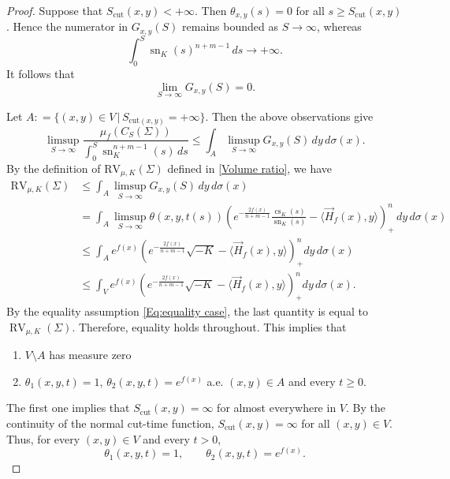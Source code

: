 \documentclass[psamsfonts]{amsart}
\theoremstyle{definition}
\theoremstyle{remark}
\DeclareMathOperator{\sn}{sn}
\numberwithin{equation}{section}
\begin{document}
\begin{proof}
    
    Suppose that $S_{\mathrm{cut}}(x,y)<+\infty$.
    Then $\theta_{x,y}(s)=0$ for all
    $s\geq S_{\mathrm{cut}}(x,y)$. Hence the numerator in
    $G_{x,y}(S)$ remains bounded as $S\to\infty$, whereas
    $$
        \int_0^S\sn_K(s)^{n+m-1}\,ds\longrightarrow+\infty.
    $$
    It follows that
    $$
        \lim_{S\to\infty}G_{x,y}(S)=0.
    $$

    Let $A : = \{ (x,y) \in V \, |\, S_{\mathrm{cut}(x,y)} = + \infty \}$.
    Then the above observations give
    $$\limsup_{S \to \infty} \frac{\mu_f (C_S (\Sigma))}{\int_0^S \operatorname{sn}_K^{n+m-1} (s) \, ds } \leq  \int_{A}\limsup_{S \to \infty } G_{x,y}(S) \, dy \, d\sigma(x).$$
    By the definition of $\mathrm{RV}_{\mu , K } (\Sigma) $ defined in \eqref{Volume ratio}, we have
    \begin{align*}
        \mathrm{RV}_{\mu , K } (\Sigma) & \leq \int_A \limsup_{S \to \infty} G_{x,y}(S) \, dy \, d \sigma (x)\\
        & = \int_A \limsup_{S \to \infty} \theta(x,y, t(s))  \left( e^{-\frac{2f(x)}{n+m-1}} \frac{\operatorname{cs}_K(s)}{\operatorname{sn}_K(s)} - \langle \vec H_f (x), y \rangle \right)_+^n\, dy \, d\sigma (x)\\
        &\leq \int_A e^{f(x)} \left( e^{-\frac{2f(x)}{n+m-1}}\sqrt{-K } - \langle \vec H_f (x), y \rangle  \right)_+^n dy \, d\sigma (x)\\
        & \leq \int_{V} e^{f(x)} \left( e^{-\frac{2f(x)}{n+m-1}}\sqrt{-K } - \langle \vec H_f (x), y \rangle  \right)_+^n dy \, d\sigma (x).
    \end{align*}
    By the equality assumption \eqref{Eq:equality case}, the last
    quantity is equal to $\operatorname{RV}_{\mu,K}(\Sigma)$.
    Therefore, equality holds throughout.
    This implies that
    \begin{enumerate}
        \item $V \setminus A$ has measure zero
        \item $\theta_1 (x,y,t) = 1$, $\theta_2 ( x,y, t) = e^{f(x)}$ a.e. $(x,y) \in A$ and every $t \geq 0$.
    \end{enumerate}
    The first one implies that $S_{\mathrm{cut}}(x,y) = \infty$ for almost everywhere in $V$. By the continuity of the normal cut-time function, $S_{\mathrm{cut}}(x,y) = \infty$ for all $(x,y) \in V$.
    Thus, for every $(x,y)\in V$ and every $t>0$,
    $$
        \theta_1(x,y,t)=1,
        \qquad
        \theta_2(x,y,t)=e^{f(x)}.
    $$
    

\end{proof}
\end{document}
